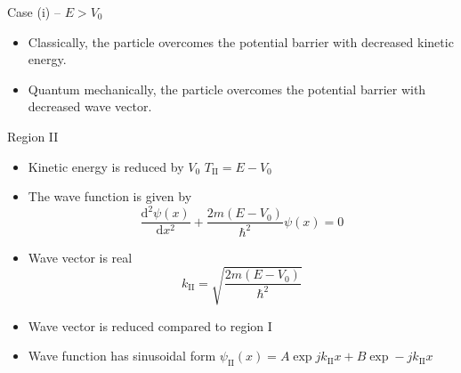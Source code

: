 \begin{frame}{Case (i) -- \(E > V_0\)}
	\begin{itemize}
	\item Classically, the particle overcomes the potential barrier with decreased kinetic energy. 
	\item Quantum mechanically, the particle overcomes the potential barrier with decreased wave vector.
\end{itemize}
\begin{footnotesize}
		\begin{block}{Region II}
		\begin{itemize}
			\item Kinetic energy is reduced by \(V_0\) \hfill
			\(
			T_\text{II} = E - V_0
			\)
			\item The wave function is given by
			\[
			\frac{\mathrm{d}^2 \psi(x)}{\mathrm{d} x^2}
			+
			\frac{2m(E- V_0)}{\hbar^2} \psi(x)
			=
			0
			\]
			\item Wave vector is real
			\[
			k_\text{II} = \sqrt{\frac{2m(E - V_0)}{\hbar^2} }
			\]
			\item Wave vector is reduced compared to region I
			\item Wave function has sinusoidal form \hfill
			\(
			\psi_\text{II}(x) = A \exp j k_\text{II} x + B \exp - j k_\text{II} x
			\)
		\end{itemize}
	\end{block}
\end{footnotesize}
\end{frame}
%

